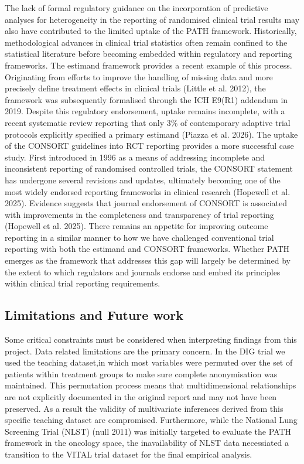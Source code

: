 \documentclass{article}
\begin{document}
The lack of formal regulatory guidance on the incorporation of
predictive analyses for heterogeneity in the reporting of randomised
clinical trial results may also have contributed to the limited uptake
of the PATH framework. Historically, methodological advances in clinical
trial statistics often remain confined to the statistical literature
before becoming embedded within regulatory and reporting frameworks. The
estimand framework provides a recent example of this process.
Originating from efforts to improve the handling of missing data and
more precisely define treatment effects in clinical trials (Little et
al. 2012), the framework was subsequently formalised through the ICH
E9(R1) addendum in 2019. Despite this regulatory endorsement, uptake
remains incomplete, with a recent systematic review reporting that only
3\% of contemporary adaptive trial protocols explicitly specified a
primary estimand (Piazza et al. 2026). The uptake of the CONSORT
guidelines into RCT reporting provides a more successful case study.
First introduced in 1996 as a means of addressing incomplete and
inconsistent reporting of randomised controlled trials, the CONSORT
statement has undergone several revisions and updates, ultimately
becoming one of the most widely endorsed reporting frameworks in
clinical research (Hopewell et al. 2025). Evidence suggests that journal
endorsement of CONSORT is associated with improvements in the
completeness and transparency of trial reporting (Hopewell et al. 2025).
There remains an appetite for improving outcome reporting in a similar
manner to how we have challenged conventional trial reporting with both
the estimand and CONSORT frameworks. Whether PATH emerges as the
framework that addresses this gap will largely be determined by the
extent to which regulators and journals endorse and embed its principles
within clinical trial reporting requirements.

\subsection{Limitations and Future
work}\label{limitations-and-future-work}

Some critical constraints must be considered when interpreting findings
from this project. Data related limitations are the primary concern. In
the DIG trial we used the teaching dataset,in which most variables were
permuted over the set of patients within treatment groups to make sure
complete anonymisation was maintained. This permutation process means
that multidimensional relationships are not explicitly documented in the
original report and may not have been preserved. As a result the
validity of multivariate inferences derived from this specific teaching
dataset are compromised. Furthermore, while the National Lung Screening
Trial (NLST) (null 2011) was initially targeted to evaluate the PATH
framework in the oncology space, the inavailability of NLST data
necessiated a transition to the VITAL trial dataset for the final
empirical analysis.
\end{document}
